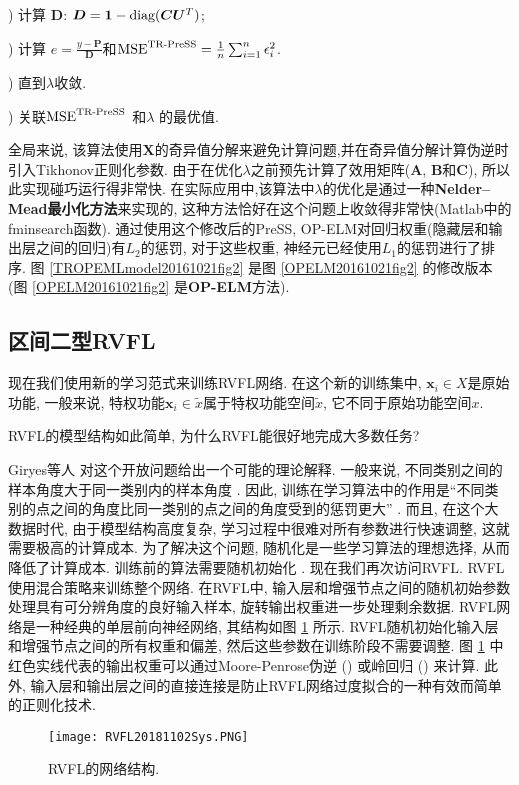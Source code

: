 ) 计算 $\bm D$: $\bm D = \bm 1-\textup{diag}(\bm C\bm U^T)$;

) 计算 $e = \frac{y-\bm P} {\bm D}$和$\textup{MSE}^{\textup{TR-PreSS}}=\frac 1 n \sum_{i=1}^n \epsilon_i^2$.

) 直到$\lambda$收敛.

) 关联$\textup{MSE}^{\textup{TR-PreSS}}$ 和$\lambda$ 的最优值.

全局来说, 该算法使用$\bm X$的奇异值分解来避免计算问题,并在奇异值分解计算伪逆时引入Tikhonov正则化参数.
由于在优化$\lambda$之前预先计算了效用矩阵($\bm A$, $\bm B$和$\bm C$), 所以此实现碰巧运行得非常快.
在实际应用中,该算法中$\lambda$的优化是通过一种\textbf{Nelder–Mead最小化方法}来实现的, 这种方法恰好在这个问题上收敛得非常快(Matlab中的fminsearch函数).
通过使用这个修改后的PreSS, OP-ELM对回归权重(隐藏层和输出层之间的回归)有$L_2$的惩罚, 对于这些权重, 神经元已经使用$L_1$的惩罚进行了排序.
图 \ref{TROPEMLmodel20161021fig2} 是图 \ref{OPELM20161021fig2} 的修改版本 (图 \ref{OPELM20161021fig2} 是\textbf{OP-ELM}方法).
\subsection{区间二型RVFL}
现在我们使用新的学习范式来训练RVFL网络.
在这个新的训练集中, $\bm x_i\in X$是原始功能, 一般来说, 特权功能$\bm x_i\in \widetilde x$属于特权功能空间$\widetilde x$, 它不同于原始功能空间$x$.

RVFL的模型结构如此简单, 为什么RVFL能很好地完成大多数任务?

Giryes等人 \cite{Giryes2016-7439822} 对这个开放问题给出一个可能的理论解释.
一般来说, 不同类别之间的样本角度大于同一类别内的样本角度 \cite{LiorWolf2003}.
因此, 训练在学习算法中的作用是“不同类别的点之间的角度比同一类别的点之间的角度受到的惩罚更大” \cite{Giryes2016-7439822}.
而且, 在这个大数据时代, 由于模型结构高度复杂, 学习过程中很难对所有参数进行快速调整, 这就需要极高的计算成本.
为了解决这个问题, 随机化是一些学习算法的理想选择, 从而降低了计算成本. 训练前的算法需要随机初始化  \cite{Glorot2015, Zhang2015}.
现在我们再次访问RVFL. RVFL使用混合策略来训练整个网络.
在RVFL中, 输入层和增强节点之间的随机初始参数处理具有可分辨角度的良好输入样本, 旋转输出权重进一步处理剩余数据.
RVFL网络是一种经典的单层前向神经网络, 其结构如图 \ref{RVFLNN181102Sys} 所示. RVFL随机初始化输入层和增强节点之间的所有权重和偏差, 然后这些参数在训练阶段不需要调整.
图 \ref{RVFLNN181102Sys} 中红色实线代表的输出权重可以通过Moore-Penrose伪逆 (\cite{paopillips1995-6471,IgelnikPao1995-6470}) 或岭回归 (\cite{Bishop2012-6469}) 来计算.
此外, 输入层和输出层之间的直接连接是防止RVFL网络过度拟合的一种有效而简单的正则化技术.
\begin{figure}[tb]
\centering
  \texttt{[image: RVFL20181102Sys.PNG]}
  \caption{RVFL的网络结构.}
  \label{RVFLNN181102Sys}
\end{figure}

